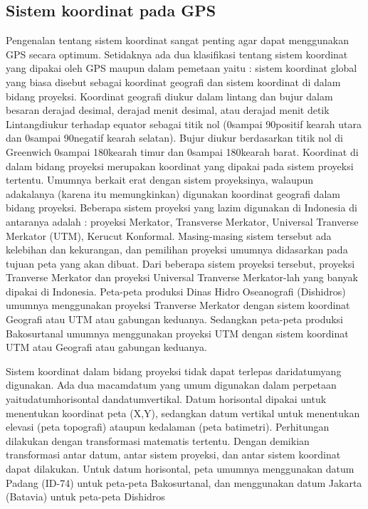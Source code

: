 \subsection{Sistem koordinat pada GPS}
Pengenalan tentang sistem koordinat sangat penting agar dapat menggunakan GPS secara optimum. Setidaknya ada dua klasifikasi tentang sistem koordinat yang dipakai oleh GPS maupun dalam pemetaan yaitu : sistem koordinat global yang biasa disebut sebagai koordinat geografi dan sistem koordinat di dalam bidang proyeksi.
Koordinat geografi diukur dalam lintang dan bujur dalam besaran derajad desimal, derajad menit desimal, atau derajad menit detik Lintangdiukur terhadap equator sebagai titik nol (0\degree  sampai 90\degree  positif kearah utara dan 0\degree  sampai 90\degree  negatif kearah selatan). Bujur diukur berdasarkan titik nol di Greenwich 0\degree  sampai 180\degree  kearah timur dan 0\degree  sampai 180\degree  kearah barat. 
Koordinat di dalam bidang proyeksi merupakan koordinat yang dipakai pada sistem proyeksi tertentu. Umumnya berkait erat dengan sistem proyeksinya, walaupun adakalanya (karena itu memungkinkan) digunakan koordinat geografi dalam bidang proyeksi. Beberapa sistem proyeksi yang lazim digunakan di Indonesia di antaranya adalah : proyeksi Merkator, Transverse Merkator, Universal Tranverse Merkator (UTM), Kerucut Konformal. Masing-masing sistem tersebut ada kelebihan dan kekurangan, dan pemilihan proyeksi umumnya didasarkan pada tujuan peta yang akan dibuat. Dari beberapa sistem proyeksi tersebut, proyeksi Tranverse Merkator dan proyeksi Universal Tranverse Merkator-lah yang banyak dipakai di Indonesia. Peta-peta produksi Dinas Hidro Oseanografi (Dishidros) umumnya menggunakan proyeksi Tranverse Merkator dengan sistem koordinat Geografi atau UTM atau gabungan keduanya. Sedangkan peta-peta produksi Bakosurtanal umumnya menggunakan proyeksi UTM dengan sistem koordinat UTM atau Geografi atau gabungan keduanya.

Sistem koordinat dalam bidang proyeksi tidak dapat terlepas daridatumyang digunakan. Ada dua macamdatum yang umum digunakan dalam perpetaan yaitudatumhorisontal dandatumvertikal. Datum horisontal dipakai untuk menentukan koordinat peta (X,Y), sedangkan datum vertikal untuk menentukan elevasi (peta topografi) ataupun kedalaman (peta batimetri). Perhitungan dilakukan dengan transformasi matematis tertentu. Dengan demikian transformasi antar datum, antar sistem proyeksi, dan antar sistem koordinat dapat dilakukan. Untuk datum horisontal, peta umumnya menggunakan datum Padang (ID-74) untuk peta-peta Bakosurtanal, dan menggunakan datum Jakarta (Batavia) untuk peta-peta Dishidros

